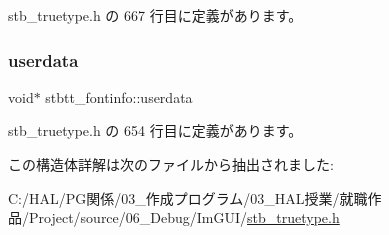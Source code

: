  stb\+\_\+truetype.\+h の 667 行目に定義があります。

\mbox{\label{structstbtt__fontinfo_a9c81078df96a7a3f730137151efab285}} 
\subsubsection{\texorpdfstring{userdata}{userdata}}
{\footnotesize\ttfamily void$\ast$ stbtt\+\_\+fontinfo\+::userdata}



 stb\+\_\+truetype.\+h の 654 行目に定義があります。



この構造体詳解は次のファイルから抽出されました\+:\begin{DoxyCompactItemize}
\item 
C\+:/\+H\+A\+L/\+P\+G関係/03\+\_\+作成プログラム/03\+\_\+\+H\+A\+L授業/就職作品/\+Project/source/06\+\_\+\+Debug/\+Im\+G\+U\+I/\mbox{\hyperlink{stb__truetype_8h}{stb\+\_\+truetype.\+h}}\end{DoxyCompactItemize}
